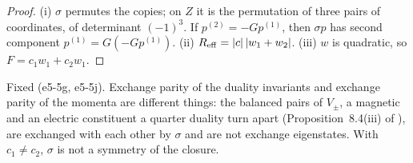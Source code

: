 \begin{proof}
(i) $\sigma$ permutes the copies; on $Z$ it is the permutation of three pairs of coordinates, of determinant $(-1)^3$. If $p^{(2)}=-Gp^{(1)}$, then
$\sigma p$ has second component $p^{(1)}=G(-Gp^{(1)})$. (ii) $R_{\rm eff}=|c|\,|w_1+w_2|$. (iii) $w$ is quadratic, so $F=c_1w_1+c_2w_1$.
\end{proof}

Fixed (e5-5g, e5-5j). Exchange parity of the duality invariants and exchange parity of the momenta are different things: the balanced pairs of $V_\pm$, a
magnetic and an electric constituent a quarter duality turn apart (Proposition~8.4(iii) of \cite{RE}), are exchanged with each other by $\sigma$ and are
not exchange eigenstates. With $c_1\neq c_2$, $\sigma$ is not a symmetry of the closure.

